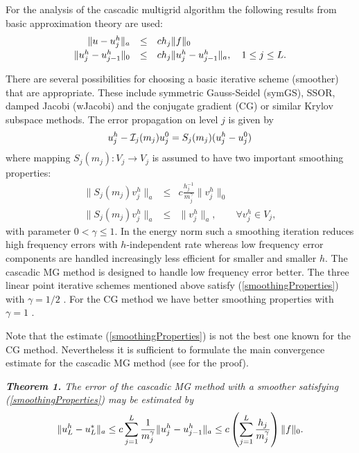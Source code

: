 For the analysis of the cascadic multigrid algorithm the following
results from basic approximation theory \cite{Cia78} are used:
\begin{equation}
     \label{approximationProperties}
     \begin{array}{rcl}
         \| u - u_j^h \|_a  &\le&  c h_j {\| f \|_0} \\[.5ex]
         \| u_j^h - u_{j-1}^h \|_0  &\le&  c h_j \| u_j^h -
u_{j-1}^h\|_a,
         \quad 1 \le j \le L.
     \end{array}
\end{equation}

There are several possibilities for choosing a basic iterative scheme
(smoother) that are appropriate.
These include symmetric Gauss-Seidel (symGS), SSOR,
damped Jacobi (wJacobi) and the conjugate gradient (CG) or similar
Krylov
subspace  methods.
The error propagation on level $j$ is given by
$$
u_j^h - {\cal I}_j(m_j) u_{j}^0 = S_j(m_j) (u_j^h - u_{j}^0)
$$
where mapping $S_j(m_j)\colon V_j \to V_j$ is assumed to have two
important smoothing properties:
\begin{equation}
  \label{smoothingProperties}
  \begin{array}{rcl}
    \| S_j(m_j) v_j^h \|_a  &\le&
    c \displaystyle\frac{h_j^{-1}}{m_j^\gamma} \| v_j^h\|_0
    \\[1.2ex]
    \| S_j(m_j) v_j^h \|_a  &\le& \| v_j^h \|_a, \qquad
    \forall v_j^h \in V_j,
  \end{array}
\end{equation}
with parameter $0 < \gamma \le 1$. In the energy norm such a
smoothing iteration reduces high frequency errors with $h$-independent
rate whereas low frequency error components are handled increasingly less
efficient for smaller and smaller $h$. 
The cascadic MG method is designed to handle low frequency error better. 
The three linear point iterative
schemes mentioned above satisfy (\ref{smoothingProperties})
with $\gamma = 1/2$ \cite{Hac85}. For the CG method we have better smoothing
properties with $\gamma = 1$ \cite{Sha96}. 

Note that the estimate (\ref{smoothingProperties}) is not the best 
one known for the CG method. Nevertheless it is sufficient to  
formulate the main convergence estimate for the cascadic MG method 
(see \cite{BD96,Sha96} for the proof).\vspace*{2mm}

{\it
  \noindent
      {\bf Theorem 1.} The error of the cascadic MG method with a smoother satisfying
      (\ref{smoothingProperties}) may be estimated by
      $$
      \| u_L^h - u_L^* \|_a \le c \sum\limits_{j=1}^L \frac{1}{m_j^\gamma}
      \| u_j^h - u_{j-1}^h \|_a \le
      c \left( \sum\limits_{j=1}^L \frac{h_j}{m_j^\gamma} \right) {\| f \|_0}.
      $$
}\vspace*{2mm}

